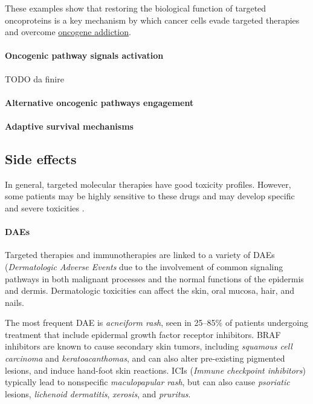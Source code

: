 These examples show that restoring the biological function of targeted oncoproteins is a key mechanism by which cancer cells evade targeted therapies and overcome \href{https://en.wikipedia.org/wiki/Oncogene_addiction}{oncogene addiction}.

\paragraph{Oncogenic pathway signals activation}

TODO da finire

\paragraph{Alternative oncogenic pathways engagement}

\paragraph{Adaptive survival mechanisms}

\subsection{Side effects}

In general, targeted molecular therapies have good toxicity profiles. However, some patients may be highly sensitive to these drugs and may develop specific and severe toxicities \cite{se_tt}.

\paragraph{DAEs}

Targeted therapies and immunotherapies are linked to a variety of DAEs (\textit{Dermatologic Adverse Events} due to the involvement of common signaling pathways in both malignant processes and the normal functions of the epidermis and dermis. Dermatologic toxicities can affect the skin, oral mucosa, hair, and nails.

The most frequent DAE is \textit{acneiform rash}, seen in 25–85\% of patients undergoing treatment that include epidermal growth factor receptor inhibitors. BRAF inhibitors are known to cause secondary skin tumors, including \textit{squamous cell carcinoma} and \textit{keratoacanthomas}, and can also alter pre-existing pigmented lesions, and induce hand-foot skin reactions. ICIs (\textit{Immune checkpoint inhibitors})  typically lead to nonspecific \textit{maculopapular rash}, but can also cause \textit{psoriatic} lesions, \textit{lichenoid dermatitis}, \textit{xerosis}, and \textit{pruritus}.


